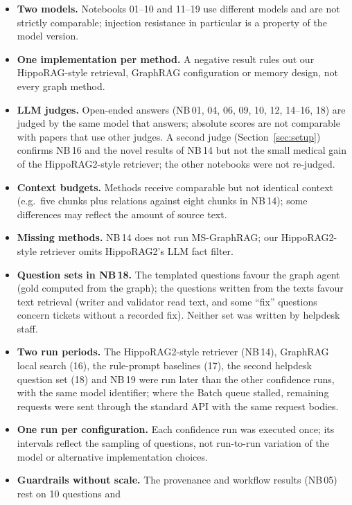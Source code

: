 \documentclass[11pt,a4paper]{article}
\newcommand{\nb}[1]{NB\,#1}
\begin{document}
\begin{itemize}
  \item \textbf{Two models.} Notebooks 01--10 and 11--19 use different models and are not strictly comparable;
        injection resistance in particular is a property of the model version.
  \item \textbf{One implementation per method.} A negative result rules out our HippoRAG-style retrieval, GraphRAG
        configuration or memory design, not every graph method.
  \item \textbf{LLM judges.} Open-ended answers (\nb{01}, 04, 06, 09, 10, 12, 14--16, 18) are judged by the same
        model that answers; absolute scores are not comparable with papers that use other judges. A second judge (Section~\ref{sec:setup})
        confirms \nb{16} and the novel results of \nb{14} but not the small medical gain of the HippoRAG2-style
        retriever; the other notebooks were not re-judged.
  \item \textbf{Context budgets.} Methods receive comparable but not identical context (e.g.\ five chunks plus
        relations against eight chunks in \nb{14}); some differences may reflect the amount of source text.
  \item \textbf{Missing methods.} \nb{14} does not run MS-GraphRAG; our HippoRAG2-style retriever omits HippoRAG2's
        LLM fact filter.
  \item \textbf{Question sets in \nb{18}.} The templated questions favour the graph agent (gold computed from the
        graph); the questions written from the texts favour text retrieval (writer and validator read text, and some
        ``fix'' questions concern tickets without a recorded fix). Neither set was written by helpdesk staff.
  \item \textbf{Two run periods.} The HippoRAG2-style retriever (\nb{14}), GraphRAG local search (16), the rule-prompt
        baselines (17), the second helpdesk question set (18) and \nb{19} were run later than the other confidence runs,
        with the same model identifier; where the Batch queue stalled, remaining requests were sent through the
        standard API with the same request bodies.
  \item \textbf{One run per configuration.} Each confidence run was executed once; its intervals reflect the sampling
        of questions, not run-to-run variation of the model or alternative implementation choices.
  \item \textbf{Guardrails without scale.} The provenance and workflow results (\nb{05}) rest on 10 questions and

\end{itemize}
\end{document}
